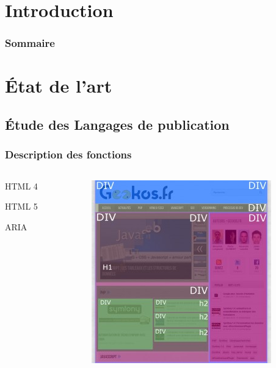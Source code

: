 \documentclass[]{beamer}
\begin{document}
\section{Introduction} 
\begin{frame}
  \frametitle{Sommaire}
\end{frame}

\begin{frame}
\end{frame}

\section{État de l'art}
\subsection{Étude des Langages de publication}
\begin{frame}
\frametitle{Description des fonctions}
\begin{columns}
	\begin{column}{4cm}
	\begin{block}{HTML 4}
	\end{block}
	\begin{block}{HTML 5}
	\end{block}
	\begin{block}{ARIA}
	\end{block}
	\end{column}
	\begin{column}{4cm}
	\includegraphics[scale=0.5]{img/architecture_HTML4.jpg}
	\end{column}
\end{columns}
\end{frame}
\end{document}
